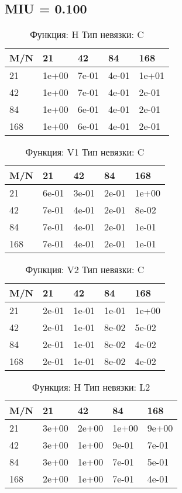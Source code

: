 \documentclass[a4paper,11pt]{article}
\begin{document}
\subsection{MIU = 0.100}
\begin{table}[H]
\caption {Функция: H Тип невязки: C   }
\begin{center}
\begin{tabular}{l|l|l|l|l}
\hline
M/N  & 21 & 42 & 84 & 168 \\ \hline
  21 & 1e+00& 7e-01& 4e-01& 1e+01\\ \hline
  42 & 1e+00& 7e-01& 4e-01& 2e-01\\ \hline
  84 & 1e+00& 6e-01& 4e-01& 2e-01\\ \hline
 168 & 1e+00& 6e-01& 4e-01& 2e-01\\ \hline
\end{tabular}
\end{center}
\end{table}
\begin{table}[H]
\caption {Функция: V1 Тип невязки: C   }
\begin{center}
\begin{tabular}{l|l|l|l|l}
\hline
M/N  & 21 & 42 & 84 & 168 \\ \hline
  21 & 6e-01& 3e-01& 2e-01& 1e+00\\ \hline
  42 & 7e-01& 4e-01& 2e-01& 8e-02\\ \hline
  84 & 7e-01& 4e-01& 2e-01& 1e-01\\ \hline
 168 & 7e-01& 4e-01& 2e-01& 1e-01\\ \hline
\end{tabular}
\end{center}
\end{table}
\begin{table}[H]
\caption {Функция: V2 Тип невязки: C   }
\begin{center}
\begin{tabular}{l|l|l|l|l}
\hline
M/N  & 21 & 42 & 84 & 168 \\ \hline
  21 & 2e-01& 1e-01& 1e-01& 1e+00\\ \hline
  42 & 2e-01& 1e-01& 8e-02& 5e-02\\ \hline
  84 & 2e-01& 1e-01& 8e-02& 4e-02\\ \hline
 168 & 2e-01& 1e-01& 8e-02& 4e-02\\ \hline
\end{tabular}
\end{center}
\end{table}
\begin{table}[H]
\caption {Функция: H Тип невязки: L2  }
\begin{center}
\begin{tabular}{l|l|l|l|l}
\hline
M/N  & 21 & 42 & 84 & 168 \\ \hline
  21 & 3e+00& 2e+00& 1e+00& 9e+00\\ \hline
  42 & 3e+00& 1e+00& 9e-01& 7e-01\\ \hline
  84 & 3e+00& 1e+00& 7e-01& 5e-01\\ \hline
 168 & 2e+00& 1e+00& 7e-01& 4e-01\\ \hline
\end{tabular}
\end{center}
\end{table}
\end{document}
